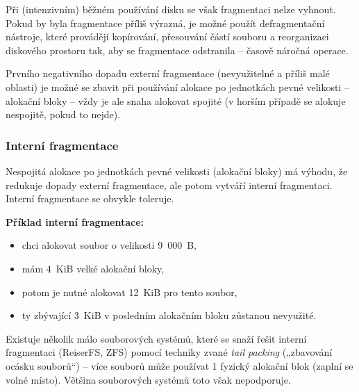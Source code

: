 \documentclass[a4paper, 11pt]{article}
\begin{document}
Při (intenzivním) běžném používání disku se však fragmentaci nelze vyhnout. Pokud by byla fragmentace příliš výrazná, je možné použít defragmentační nástroje, které provádějí kopírování, přesouvání částí souboru a reorganizaci diskového prostoru tak, aby se fragmentace odstranila -- časově náročná operace.

Prvního negativního dopadu externí fragmentace (nevyužitelné a příliš malé oblasti) je možné se zbavit při používání alokace po jednotkách pevné velikosti -- alokační bloky -- vždy je ale snaha alokovat spojité (v horším případě se alokuje nespojitě, pokud to nejde).

\subsubsection{Interní fragmentace}
Nespojitá alokace po jednotkách pevné velikosti (alokační bloky) má výhodu, že redukuje dopady externí fragmentace, ale potom vytváří interní fragmentaci. Interní fragmentace se obvykle toleruje. 
 
\textbf{Příklad interní fragmentace:}
\begin{itemize}
    \item chci alokovat soubor o velikosti 9~000~B,
    \item mám 4~KiB velké alokační bloky,
    \item potom je nutné alokovat 12~KiB pro tento soubor,
    \item ty zbývající 3~KiB v posledním alokačním bloku zůstanou nevyužité.
\end{itemize}
 
Existuje několik málo souborových systémů, které se snaží řešit interní fragmentaci (ReiserFS, ZFS) pomocí techniky zvané \emph{tail packing} („zbavování ocásku souborů“) -- více souborů může používat 1 fyzický alokační blok (zaplní se volné místo). Většina souborových systémů toto však nepodporuje.
\end{document}

